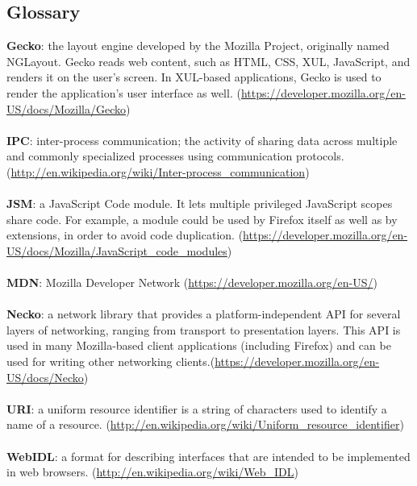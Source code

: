 \documentclass[12pt]{article}
\begin{document}
\subsection{Glossary}
\textbf{Gecko}: the layout engine developed by the Mozilla Project, originally named NGLayout. Gecko reads web content, such as HTML, CSS, XUL, JavaScript, and renders it on the user's screen. In XUL-based applications, Gecko is used to render the application's user interface as well. (\href{https://developer.mozilla.org/en-US/docs/Mozilla/Gecko}{https://developer.mozilla.org/en-US/docs/Mozilla/Gecko})
\\\\
\textbf{IPC}: inter-process communication; the activity of sharing data across multiple and commonly specialized processes using communication protocols. (\href{http://en.wikipedia.org/wiki/Inter-process_communication}{http://en.wikipedia.org/wiki/Inter-process\_communication})
\\\\
\textbf{JSM}: a JavaScript Code module. It lets multiple privileged JavaScript scopes share code. For example, a module could be used by Firefox itself as well as by extensions, in order to avoid code duplication. (\href{https://developer.mozilla.org/en-US/docs/Mozilla/JavaScript_code_modules}{https://developer.mozilla.org/en-US/docs/Mozilla/JavaScript\_code\_modules})
\\\\
\textbf{MDN}: Mozilla Developer Network (\href{https://developer.mozilla.org/en-US/}{https://developer.mozilla.org/en-US/})
\\\\
\textbf{Necko}: a network library that provides a platform-independent API for several layers of networking, ranging from transport to presentation layers. This API is used in many Mozilla-based client applications (including Firefox) and can be used for writing other networking clients.(\href{https://developer.mozilla.org/en-US/docs/Necko}{https://developer.mozilla.org/en-US/docs/Necko})
\\\\
\textbf{URI}: a uniform resource identifier is a string of characters used to identify a name of a resource. (\href{http://en.wikipedia.org/wiki/Uniform_resource_identifier}{http://en.wikipedia.org/wiki/Uniform\_resource\_identifier})
\\\\
\textbf{WebIDL}: a format for describing interfaces that are intended to be implemented in web browsers. (\href{http://en.wikipedia.org/wiki/Web_IDL}{http://en.wikipedia.org/wiki/Web\_IDL})
\end{document}
